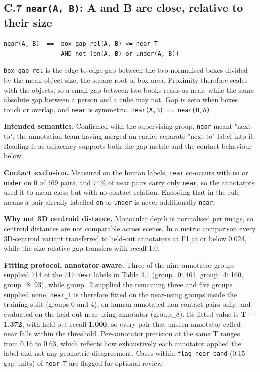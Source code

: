 \subsection{C.7 \texttt{near(A, B)}: A and B are close, relative to their size}

\begingroup\small\begin{verbatim}
near(A, B)  ==  box_gap_rel(A, B) <= near_T
                AND not (on(A, B) or under(A, B))
\end{verbatim}\endgroup

\texttt{box\_\allowbreak{}gap\_\allowbreak{}rel} is the edge-to-edge gap between the two normalised boxes divided by the mean object size, the square root of box area. Proximity therefore scales with the objects, so a small gap between two books reads as near, while the same absolute gap between a person and a cube may not. Gap is zero when boxes touch or overlap, and \texttt{near} is symmetric, \texttt{near(A,B) == near(B,A)}.

\textbf{Intended semantics.} Confirmed with the supervising group, \texttt{near} meant "next to", the annotation team having merged an earlier separate "next to" label into it. Reading it as adjacency supports both the gap metric and the contact behaviour below.

\textbf{Contact exclusion.} Measured on the human labels, \texttt{near} co-occurs with \texttt{on} or \texttt{under} on 0 of 469 pairs, and 74\% of near pairs carry only \texttt{near}, so the annotators used it to mean close but with no contact relation. Encoding that in the rule means a pair already labelled \texttt{on} or \texttt{under} is never additionally \texttt{near}.

\textbf{Why not 3D centroid distance.} Monocular depth is normalised per image, so centroid distances are not comparable across scenes. In a metric comparison every 3D-centroid variant transferred to held-out annotators at F1 at or below 0.024, while the size-relative gap transfers with recall 1.0.

\textbf{Fitting protocol, annotator-aware.} Three of the nine annotator groups supplied 714 of the 717 \texttt{near} labels in Table 4.1 (group\_\allowbreak{}0: 461, group\_\allowbreak{}4: 160, group\_\allowbreak{}8: 93), while group\_\allowbreak{}2 supplied the remaining three and five groups supplied none. \texttt{near\_\allowbreak{}T} is therefore fitted on the near-using groups inside the training split (groups 0 and 4), on human-annotated non-contact pairs only, and evaluated on the held-out near-using annotator (group\_\allowbreak{}8). Its fitted value is \textbf{T = 1.372}, with held-out recall \textbf{1.000}, so every pair that unseen annotator called near falls within the threshold. Per-annotator precision at the same T ranges from 0.16 to 0.63, which reflects how exhaustively each annotator applied the label and not any geometric disagreement. Cases within \texttt{flag\_\allowbreak{}near\_\allowbreak{}band} (0.15 gap units) of \texttt{near\_\allowbreak{}T} are flagged for optional review.

